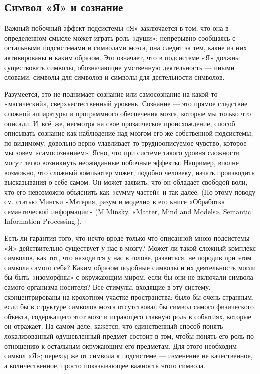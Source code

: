 \documentclass[../main.tex]{subfiles}
\begin{document}
\subsection{Символ «Я» и сознание}

Важный побочный эффект подсистемы «Я» заключается в том, что она в определенном смысле может играть роль «души»: непрерывно сообщаясь с остальными подсистемами и символами мозга, она следит за тем, какие из них активированы и каким образом. Это означает, что в подсистеме «Я» должны существовать символы, обозначающие умственную деятельность --- иными словами, символы для символов и символы для деятельности символов.

Разумеется, это не поднимает сознание или самосознание на какой-то «магический», сверхъестественный уровень. Сознание --- это прямое следствие сложной аппаратуры и программного обеспечения мозга, которые мы только что описали. И~всё~же, несмотря на свое прозаическое происхождение, способ описывать сознание как наблюдение над мозгом его же собственной подсистемы, по-видимому, довольно верно улавливает то трудноописуемое чувство, которое мы зовем «самосознанием». Ясно, что при системе такого уровня сложности могут легко возникнуть неожиданные побочные эффекты. Например, вполне возможно, что сложный компьютер может, подобно человеку, начать производить высказывания о себе самом. Он может заявить, что он обладает свободой воли, что его невозможно объяснить как «сумму частей» и так далее. (По этому поводу см. статью Мински «Материя, разум и модели» в его книге «Обработка семантической информации» (M.Minsky, «Matter, Mind and Models». Semantic Information Processing.).

Есть ли гарантия того, что нечто вроде только что описанной мною подсистемы «Я» действительно существует у нас в мозгу? Может ли такой сложный комплекс символов, как тот, что находится у нас в голове, развиться, не породив при этом символа самого себя? Каким образом подобные символы и их деятельность могли бы быть «изоморфны» с окружающим миром, если бы они не включали символа самого организма-носителя? Все стимулы, входящие в эту систему, сконцентрированы на крохотном участке пространства; было бы очень странным, если бы в структуре символов мозга отсутствовал бы символ самого физического объекта, содержащего этот мозг и играющего главную роль в событиях, которые он отражает. На самом деле, кажется, что единственный способ понять локализованный одушевленный предмет состоит в том, чтобы понять его роль по отношению к остальным окружающим его предметам. Для этого необходим символ «Я»; переход же от символа к подсистеме --- изменение не качественное, а количественное, просто показывающее важность этого символа.
\end{document}
